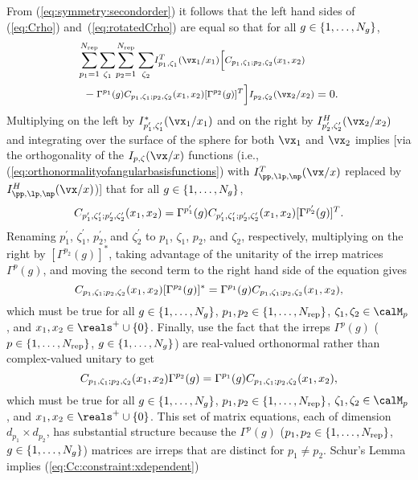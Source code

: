 From (\ref{eq:symmetry:secondorder}) %
it follows that the left hand sides
of (\ref{eq:Crho}) and~(\ref{eq:rotatedCrho}) %
are equal so that for
all $g\in\{1,\dots,N_g\}$,
\begin{align}
\begin{aligned}[t]
&{\sum_{p_1=1}^{\Nirrep}}
{\sum_{\zeta_1}}
{\sum_{p_2=1}^{\Nirrep}
\sum_{\zeta_2}}
\medmath{I_{p_1,\zeta_1}^T(\vx_1/x_1)}\medmath{\biggl[
\CcREAL(x_1,x_2)}\\
&{~}-\medmath{
\Gamma^{p_1}(g)}
\medmath{\CcREAL(x_1,x_2)
[\Gamma^{p_2}(g)]^T
\biggr]}\medmath{I_{p_2,\zeta_2}(\vx_2/x_2)}
=
0
.
\end{aligned}
\end{align}
Multiplying on the left by $I_{p_1^\prime,\zeta_1^\prime}^\ast(\vx_1/x_1)$ and
on the right by $I_{p_2^\prime,\zeta_2^\prime}^H(\vx_2/x_2)$ and
integrating over the surface of the sphere for both $\vx_1$ and $\vx_2$
implies [via the orthogonality of the $I_{p,\zeta}(\vx/x)$ functions
(i.e., (\ref{eq:orthonormalityofangularbasisfunctions}) %
with
$I_{\pp,\lp,\np}^T(\vx/x)$ replaced by $I_{\pp,\lp,\np}^H(\vx/x)$)] that for all
$g\in\{1,\dots,N_g\}$,
\begin{align}
C_{p_1^\prime,\zeta_1^\prime;p_2^\prime,\zeta_2^\prime}(x_1,x_2)=
\Gamma^{p_1^\prime}(g)
C_{p_1^\prime,\zeta_1^\prime;p_2^\prime,\zeta_2^\prime}(x_1,x_2)
[\Gamma^{p_2^\prime}(g)]^T.
\end{align}
Renaming $p_1^\prime$, $\zeta_1^\prime$, $p_2^\prime$, and $\zeta_2^\prime$
to $p_1$, $\zeta_1$, $p_2$, and $\zeta_2$, respectively, multiplying on the
right by $[\Gamma^{p_2}(g)]^\ast$, taking advantage of the unitarity of
the irrep matrices $\Gamma^p(g)$, and moving the second term to the right
hand side of the equation gives
\begin{equation}
C_{p_1,\zeta_1;p_2,\zeta_2}(x_1,x_2)
[\Gamma^{p_2}(g)]^\ast
=
\Gamma^{p_1}(g)
C_{p_1,\zeta_1;p_2,\zeta_2}(x_1,x_2)
\label{eq:constraint:covariance:rhorho}
,
\end{equation}
which must be true for all $g\in\{1,\dots,N_g\}$,
$p_1,p_2\in\{1,\dots,N_{\rm rep}\}$, $\zeta_1,\zeta_2\in\calM_p$, and
$x_1,x_2\in\nonnegative$.
Finally, use the fact that the irreps $\Gamma^p(g)$
($p\in\{1,\dots,N_{\rm rep}\}$, $g\in\{1,\dots,N_g\}$) are real-valued
orthonormal rather than complex-valued unitary to get
\begin{equation}
C_{p_1,\zeta_1;p_2,\zeta_2}(x_1,x_2)
\Gamma^{p_2}(g)
=
\Gamma^{p_1}(g)
C_{p_1,\zeta_1;p_2,\zeta_2}(x_1,x_2)
\label{eq:constraint:covariance:rhorho:Gammareal}
,
\end{equation}
which must be true for all $g\in\{1,\dots,N_g\}$,
$p_1,p_2\in\{1,\dots,N_{\rm rep}\}$, $\zeta_1,\zeta_2\in\calM_p$, and
$x_1,x_2\in\nonnegative$.
This set of matrix equations, each of dimension $d_{p_1}\times
d_{p_2}$, has substantial structure because the $\Gamma^p(g)$
($p_1,p_2\in\{1,\dots,N_{\rm rep}\}$, $g\in\{1,\dots,N_g\}$) matrices are
irreps that are distinct for $p_1\neq p_2$.
Schur's Lemma~\cite[Corollary~3.2, p.~70]{Miller1972}
implies (\ref{eq:Cc:constraint:xdependent}) %
